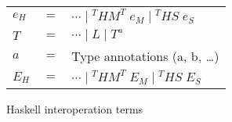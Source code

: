 \begin{figure}
\begin{center}
\begin{tabular}{lcl}
$e_{H}$ & $=$ & $\cdots\;\vert\;^{T}HM^{T}\;e_{M}\;\vert\;^{T}HS\;e_{S}$ \\
$T$ & $=$ & $\cdots\;\vert\;L\;\vert\;T^{a}$ \\
$a$ & $=$ & Type annotations (a, b, \ldots) \\
$E_{H}$ & $=$ & $\cdots\;\vert\;^{T}HM^{T}\;E_{M}\;\vert\;^{T}HS\;E_{S}$
\end{tabular}
\end{center}
\caption{Haskell interoperation terms}
\label{fig:hit}
\end{figure}